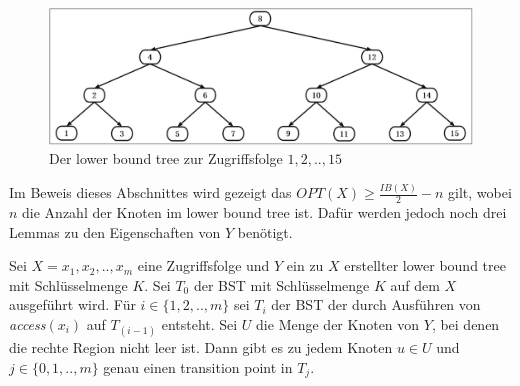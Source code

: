 \documentclass[a4paper,12pt]{article}
\begin{document}
\begin{figure}[h]
	\centering
	\includegraphics[width=1\textwidth]{"Medien/Tango/lowerBoundTree"}
	\caption{Der lower bound tree zur Zugriffsfolge $1 ,2, .., 15$  }
	\label{fig:demlowerBoundTree}
\end{figure}

\noindent Im Beweis dieses Abschnittes wird gezeigt das $\mathit{OPT}\left(X\right) \geq \frac{\mathit{IB}\left(X\right)}{2} - n$ gilt, wobei $n$ die Anzahl der Knoten im lower bound tree ist. Dafür werden jedoch noch drei Lemmas zu den Eigenschaften von $Y$ benötigt. 

\begin{Lemma} \label{demaineLemma1}
	Sei $X = x_1,x_2,..,x_m$ eine Zugriffsfolge und $Y$ ein zu $X$ erstellter lower bound tree mit Schlüsselmenge $K$. Sei $T_0$ der BST mit Schlüsselmenge $K$ auf dem $X$ ausgeführt wird. Für $i \in \{1,2,..,m\}$ sei $T_i$ der BST der durch Ausführen von \textit{access}$\left(x_i\right)$ auf $T_{\left(i-1\right)}$ entsteht. Sei $U$ die Menge der Knoten von $Y$, bei denen die rechte Region nicht leer ist. Dann gibt es zu jedem Knoten $u \in U$ und $j \in \{0,1,..,m\}$ genau einen transition point in $T_j$. 	
\end{Lemma}
\end{document}
